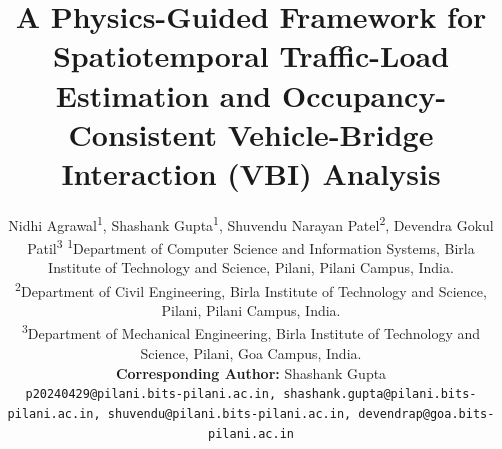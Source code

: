 \documentclass[journal]{IEEEtran}
\begin{document}
\title{A Physics-Guided Framework for Spatiotemporal Traffic-Load Estimation and Occupancy-Consistent Vehicle-Bridge Interaction (VBI) Analysis}
\author{\footnotesize
    Nidhi Agrawal\textsuperscript{1},
    Shashank Gupta\textsuperscript{1},
    Shuvendu Narayan Patel\textsuperscript{2},
    Devendra Gokul Patil\textsuperscript{3}
    {\small
    \textsuperscript{1}Department of Computer Science and Information Systems, Birla Institute of Technology and Science, Pilani, Pilani Campus, India. \\
    \textsuperscript{2}Department of Civil Engineering, Birla Institute of Technology and Science, Pilani, Pilani Campus, India.\\
    \textsuperscript{3}Department of Mechanical Engineering, Birla Institute of Technology and Science, Pilani, Goa Campus, India. \\
    }
    {\scriptsize \textbf{Corresponding Author:} Shashank Gupta} \\[0.ex]
    \scriptsize
    \texttt{p20240429@pilani.bits-pilani.ac.in, shashank.gupta@pilani.bits-pilani.ac.in, shuvendu@pilani.bits-pilani.ac.in, devendrap@goa.bits-pilani.ac.in}
}
\maketitle
\end{document}
